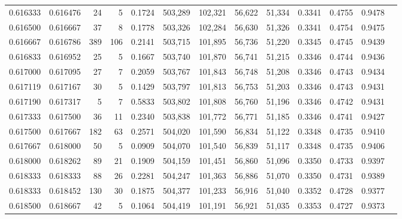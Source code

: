\begin{tabular}{rrrrrrrrrrrrr}
0.616333 & 0.616476 &    24 &   5 &                                     0.1724 & 503,289 & 102,321 &  56,622 &  51,334 & 0.3341 & 0.4755 & 0.9478 \\
0.616500 & 0.616667 &    37 &   8 &                                     0.1778 & 503,326 & 102,284 &  56,630 &  51,326 & 0.3341 & 0.4754 & 0.9475 \\
0.616667 & 0.616786 &   389 & 106 &                                     0.2141 & 503,715 & 101,895 &  56,736 &  51,220 & 0.3345 & 0.4745 & 0.9439 \\
0.616833 & 0.616952 &    25 &   5 &                                     0.1667 & 503,740 & 101,870 &  56,741 &  51,215 & 0.3346 & 0.4744 & 0.9436 \\
0.617000 & 0.617095 &    27 &   7 &                                     0.2059 & 503,767 & 101,843 &  56,748 &  51,208 & 0.3346 & 0.4743 & 0.9434 \\
0.617119 & 0.617167 &    30 &   5 &                                     0.1429 & 503,797 & 101,813 &  56,753 &  51,203 & 0.3346 & 0.4743 & 0.9431 \\
0.617190 & 0.617317 &     5 &   7 &                                     0.5833 & 503,802 & 101,808 &  56,760 &  51,196 & 0.3346 & 0.4742 & 0.9431 \\
0.617333 & 0.617500 &    36 &  11 &                                     0.2340 & 503,838 & 101,772 &  56,771 &  51,185 & 0.3346 & 0.4741 & 0.9427 \\
0.617500 & 0.617667 &   182 &  63 &                                     0.2571 & 504,020 & 101,590 &  56,834 &  51,122 & 0.3348 & 0.4735 & 0.9410 \\
0.617667 & 0.618000 &    50 &   5 &                                     0.0909 & 504,070 & 101,540 &  56,839 &  51,117 & 0.3348 & 0.4735 & 0.9406 \\
0.618000 & 0.618262 &    89 &  21 &                                     0.1909 & 504,159 & 101,451 &  56,860 &  51,096 & 0.3350 & 0.4733 & 0.9397 \\
0.618333 & 0.618333 &    88 &  26 &                                     0.2281 & 504,247 & 101,363 &  56,886 &  51,070 & 0.3350 & 0.4731 & 0.9389 \\
0.618333 & 0.618452 &   130 &  30 &                                     0.1875 & 504,377 & 101,233 &  56,916 &  51,040 & 0.3352 & 0.4728 & 0.9377 \\
0.618500 & 0.618667 &    42 &   5 &                                     0.1064 & 504,419 & 101,191 &  56,921 &  51,035 & 0.3353 & 0.4727 & 0.9373 \\

\end{tabular}
